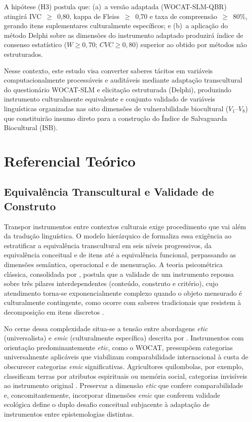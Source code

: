 \documentclass[3p,times]{elsarticle}
\begin{document}
A hipótese (H3) postula que: (a)~a versão adaptada (WOCAT-SLM-QBR) atingirá IVC~$\geq$~0,80, kappa de Fleiss~$\geq$~0,70 e taxa de compreensão~$\geq$~80\%, gerando itens suplementares culturalmente específicos; e (b)~a aplicação do método Delphi sobre as dimensões do instrumento adaptado produzirá índice de consenso estatístico ($W \geq 0{,}70$; $CVC \geq 0{,}80$) superior ao obtido por métodos não estruturados.

Nesse contexto, este estudo visa converter saberes tácitos em variáveis computacionalmente processáveis e auditáveis mediante adaptação transcultural do questionário WOCAT-SLM e elicitação estruturada (Delphi), produzindo instrumento culturalmente equivalente e conjunto validado de variáveis linguísticas organizadas nas oito dimensões de vulnerabilidade biocultural ($V_1$--$V_8$) que constituirão insumo direto para a construção do Índice de Salvaguarda Biocultural (ISB).


\section{Referencial Teórico}
\label{sec:theory}

\subsection{Equivalência Transcultural e Validade de Construto}

Transpor instrumentos entre contextos culturais exige procedimento que vai além da tradução linguística. O modelo hierárquico de \citet{Herdman1999} formaliza essa exigência ao estratificar a equivalência transcultural em seis níveis progressivos, da equivalência conceitual e de itens até a equivalência funcional, perpassando as dimensões semântica, operacional e de mensuração. A teoria psicométrica clássica, consolidada por \citet{Nunnally1978}, postula que a validade de um instrumento repousa sobre três pilares interdependentes (conteúdo, construto e critério), cujo atendimento torna-se exponencialmente complexo quando o objeto mensurado é culturalmente contingente, como ocorre com saberes tradicionais que resistem à decomposição em itens discretos \citep{Polanyi1966}.

No cerne dessa complexidade situa-se a tensão entre abordagens \textit{etic} (universalista) e \textit{emic} (culturalmente específica) descrita por \citet{Pike1967}. Instrumentos com orientação predominantemente \textit{etic}, como o WOCAT, pressupõem categorias universalmente aplicáveis que viabilizam comparabilidade internacional à custa de obscurecer categorias \textit{emic} significativas. Agricultores quilombolas, por exemplo, classificam terras por atributos espirituais ou memória social, categorias invisíveis ao instrumento original \citep{Toledo2008}. Preservar a dimensão \textit{etic} que confere comparabilidade e, concomitantemente, incorporar dimensões \textit{emic} que conferem validade ecológica define o duplo desafio conceitual subjacente à adaptação de instrumentos entre epistemologias distintas.
\end{document}
